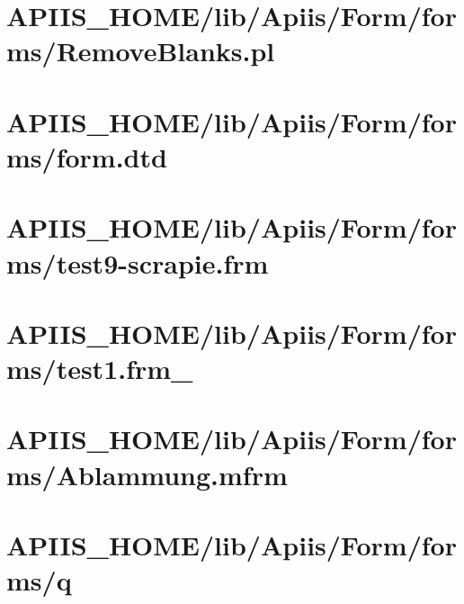 \section{APIIS\_HOME/lib/Apiis/Form/forms/RemoveBlanks.pl} 
\section{APIIS\_HOME/lib/Apiis/Form/forms/form.dtd} 
\section{APIIS\_HOME/lib/Apiis/Form/forms/test9-scrapie.frm} 
\section{APIIS\_HOME/lib/Apiis/Form/forms/test1.frm\_} 
\section{APIIS\_HOME/lib/Apiis/Form/forms/Ablammung.mfrm} 
\section{APIIS\_HOME/lib/Apiis/Form/forms/q} 
